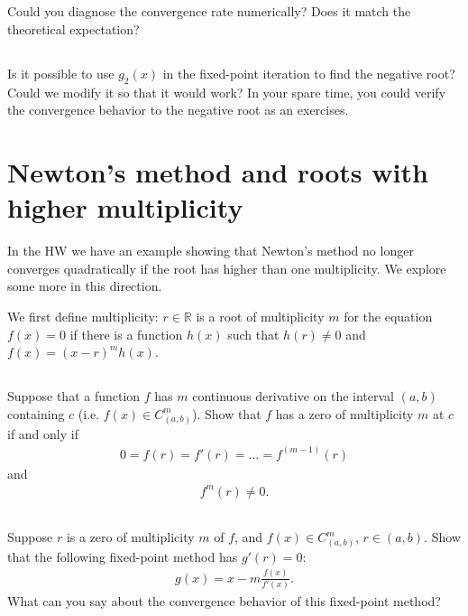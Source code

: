 \documentclass[11pt,letterpaper]{article}
\begin{document}
\subsection{}
Could you diagnose the convergence rate numerically? Does it match the theoretical expectation?

\subsection{}
Is it possible to use $g_2(x)$ in the fixed-point iteration to find the negative root? Could we modify it so that it would work? In your spare time, you could verify the convergence behavior to the negative root as an exercises. 

\newpage
\section{Newton's method and roots with higher multiplicity}
In the HW we have an example showing that Newton's method no longer converges quadratically if the root has higher than one multiplicity. We explore some more in this direction.

We first define multiplicity: $r\in \mathbb{R}$ is a root of multiplicity $m$ for the equation $f(x)=0$ if there is a function $h(x)$ such that $h(r)\neq 0$ and $f(x) = (x-r)^m h(x)$.

\subsection{}
Suppose that a function $f$ has $m$ continuous derivative on the interval $(a,b)$ containing $c$ (i.e. $f(x)\in C^m_{(a,b)}$). Show that $f$ has a zero of multiplicity $m$ at $c$ if and only if
\begin{align*}
    0 = f(r) = f'(r) = \dots = f^{(m-1)}(r)
\end{align*}
and
\begin{align*}
    f^{m}(r) \neq 0.
\end{align*}

\subsection{}
Suppose $r$ is a zero of multiplicity $m$ of $f$, and $f(x)\in C^m_{(a,b)}$, $r\in (a,b)$. Show that the following fixed-point method has $g'(r) = 0$:
\begin{align*}
    g(x) = x-m\frac{f(x)}{f'(x)}.
\end{align*}
What can you say about the convergence behavior of this fixed-point method?
\end{document}
